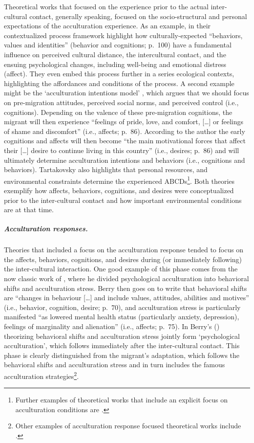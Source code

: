 \documentclass[man, 12pt, a4paper, mask]{apa7}
\begin{document}
Theoretical works that focused on the experience prior to the actual
inter-cultural contact, generally speaking, focused on the
socio-structural and personal expectations of the acculturation
experience. As an example, \citet[][]{Ward2016} in their contextualized
process framework highlight how culturally-expected ``behaviors, values
and identities'' (behavior and cognitions; p.~100) have a fundamental
influence on perceived cultural distance, the intercultural contact, and
the ensuing psychological changes, including well-being and emotional
distress (affect). They even embed this process further in a series
ecological contexts, highlighting the affordances and conditions of the
process. A second example might be the `acculturation intentions model'
\citep[][]{Tartakovsky2012}, which argues that we should focus on
pre-migration attitudes, perceived social norms, and perceived control
(i.e., cognitions). Depending on the valence of these pre-migration
cognitions, the migrant will then experience ``feelings of pride, love,
and comfort, {[}\ldots{]} or feelings of shame and discomfort'' (i.e.,
affects; p.~86). According to the author the early cognitions and
affects will then become ``the main motivational forces that affect
their {[}\ldots{]} desire to continue living in this country'' (i.e.,
desires; p.~86) and will ultimately determine acculturation intentions
and behaviors (i.e., cognitions and behaviors). Tartakovsky also
highlights that personal resources, and environmental constraints
determine the experienced
ABCDs\footnote{Further examples of theoretical works that include an explicit focus on acculturation conditions are \citet[][]{Kim1988, Rogler1994, Navas2005, Giles1977, Robinson2019, Serdarevic2005}.}.
Both theories exemplify how affects, behaviors, cognitions, and desires
were conceptualized prior to the inter-cultural contact and how
important environmental conditions are at that time.

\subparagraph{Acculturation responses.}

Theories that included a focus on the acculturation response tended to
focus on the affects, behaviors, cognitions, and desires during (or
immediately following) the inter-cultural interaction. One good example
of this phase comes from the now classic work of \citet[][]{Berry1992},
where he divided psychological acculturation into behavioral shifts and
acculturation stress. Berry then goes on to write that behavioral shifts
are ``changes in behaviour {[}\ldots{]} and include values, attitudes,
abilities and motives'' (i.e., behavior, cognition, desire; p.~70), and
acculturation stress is particularly manifested ``as lowered mental
health status (particularly anxiety, depression), feelings of
marginality and alienation'' (i.e., affects; p.~75). In Berry's
(\citeyear{Berry1992}) theorizing behavioral shifts and acculturation
stress jointly form `psychological acculturation', which follows
immediately after the inter-cultural contact. This phase is clearly
distinguished from the migrant's adaptation, which follows the
behavioral shifts and acculturation stress and in turn includes the
famous acculturation
strategies\footnote{Other examples of acculturation response focused theoretical works include \citet[][]{Berry2005, Sam2003, Riedel2011, Ward2016}.}.
\end{document}
